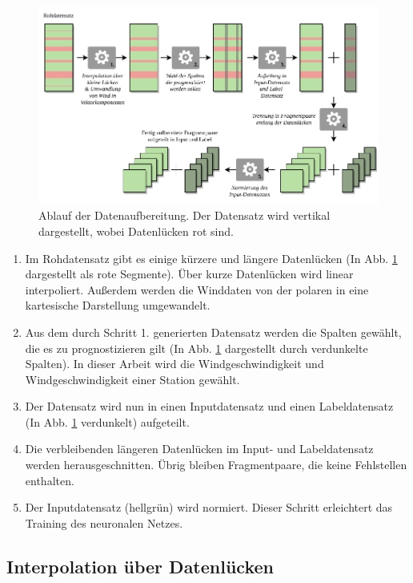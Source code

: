 \documentclass[
12pt, %
toc=listofnumbered, %
toc=chapterentrydotfill, %
numbers=noenddot, %
captions=tableheading, %
bibliography=numbered
]{scrreprt}
\let\Oldsubsection\subsection
\renewcommand{\subsection}{\FloatBarrier\Oldsubsection}
\newcommand{\qm}[1]{\glqq#1\grqq{}} %
\begin{document}
\begin{figure}[tph]
	\begin{center}
		\includegraphics[]{./images/preprocessing.pdf}
		\caption{Ablauf der Datenaufbereitung. Der Datensatz wird vertikal dargestellt, wobei Datenlücken rot sind.}
		\label{fig:preprocessing}
	\end{center}
\end{figure}

\begin{enumerate}
	\item Im Rohdatensatz gibt es einige kürzere und längere Datenlücken (In Abb. \ref{fig:preprocessing} dargestellt als rote Segmente). Über kurze Datenlücken wird linear interpoliert. Außerdem werden die Winddaten von der polaren in eine kartesische Darstellung umgewandelt.
	\item Aus dem durch Schritt 1. generierten Datensatz werden die Spalten gewählt, die es zu prognostizieren gilt (In Abb. \ref{fig:preprocessing} dargestellt durch verdunkelte Spalten). In dieser Arbeit wird die Windgeschwindigkeit und Windgeschwindigkeit einer Station gewählt.
	\item Der Datensatz wird nun in einen Inputdatensatz und einen Labeldatensatz (In Abb. \ref{fig:preprocessing} verdunkelt) aufgeteilt.
	\item Die verbleibenden längeren Datenlücken im Input- und Labeldatensatz werden \qm{herausgeschnitten}. Übrig bleiben Fragmentpaare, die keine Fehlstellen enthalten.
	\item Der Inputdatensatz (hellgrün) wird normiert. Dieser Schritt erleichtert das Training des neuronalen Netzes.
\end{enumerate}

\subsection{Interpolation über Datenlücken}\label{section:Datenlücken}
\end{document}
